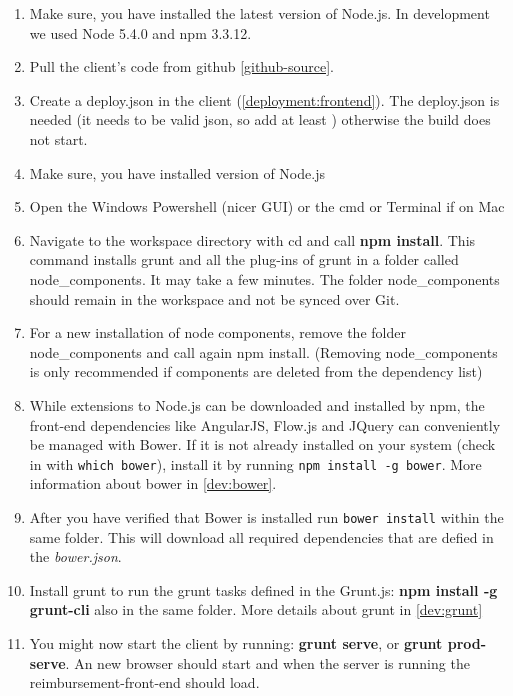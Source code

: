 \begin{enumerate}
	\item Make sure, you have installed the latest version of Node.js. In development we used Node 5.4.0 and npm 3.3.12.
	\item  Pull the client's code from github \ref{github-source}.
	\item  Create a deploy.json in the client (\ref{deployment:frontend}). The deploy.json is needed (it needs to be valid json, so add at least \textbf{{}}) otherwise the build does not start.
	\item Make sure, you have installed version of Node.js
	\item Open the Windows Powershell (nicer GUI) or the cmd or Terminal if on Mac
	\item Navigate to the workspace directory with cd and call \textbf{npm install}. This command installs grunt and all the plug-ins of grunt in a folder called node\_components. It may take a few minutes. The folder node\_components should remain in the workspace and not be synced over Git. 
	\item For a new installation of node components, remove the folder node\_components and call again npm install. (Removing node\_components is only recommended if components are deleted from the dependency list)
	
	\item While extensions to Node.js can be downloaded and installed by npm, the front-end dependencies like AngularJS, Flow.js and JQuery can conveniently be managed with Bower. If it is not already installed on your system (check in with \texttt{which bower}), install it by running \texttt{npm install -g bower}.  More information about bower in \ref{dev:bower}.
	\item After you have verified that Bower is installed run \texttt{bower install} within the same folder. This will download all required dependencies that are defied in the \textit{bower.json}.
	\item Install grunt to run the grunt tasks defined in the Grunt.js: \textbf{npm install -g grunt-cli} also in the same folder. More details about grunt in \ref{dev:grunt}
	\item You might now start the client by running: \textbf{grunt serve}, or \textbf{grunt prod-serve}. An new browser should start and when the server is running the reimbursement-front-end should load.
\end{enumerate}

